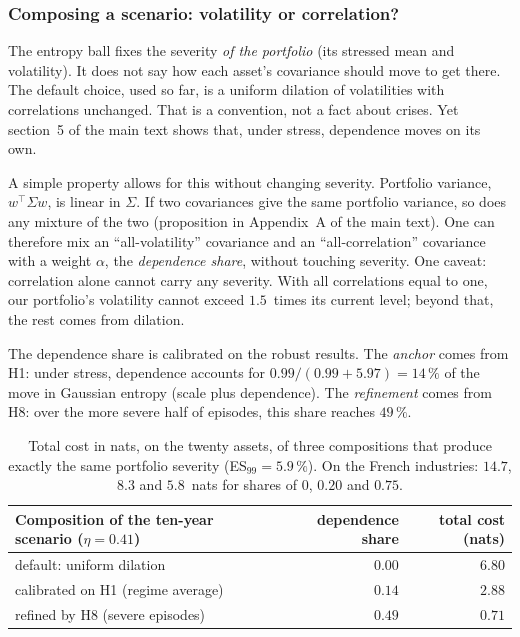 \documentclass[11pt]{article}
\theoremstyle{definition}
\begin{document}
\subsubsection{Composing a scenario: volatility or correlation?}
\label{sec:composition}

The entropy ball fixes the severity \emph{of the portfolio} (its stressed mean
and volatility). It does not say how each asset's covariance should move to
get there. The default choice, used so far, is a uniform dilation of
volatilities with correlations unchanged. That is a convention, not a fact
about crises. Yet section~5 of the main text shows that, under stress,
dependence moves on its own.

A simple property allows for this without changing severity. Portfolio
variance, $w^\top\Sigma w$, is linear in $\Sigma$. If two covariances give the
same portfolio variance, so does any mixture of the two (proposition in
Appendix~A of the main text). One can therefore mix an ``all-volatility''
covariance and an ``all-correlation'' covariance with a weight $\alpha$, the
\emph{dependence share}, without touching severity. One caveat: correlation
alone cannot carry any severity. With all correlations equal to one, our
portfolio's volatility cannot exceed $1.5$~times its current level; beyond
that, the rest comes from dilation.

The dependence share is calibrated on the robust results. The \emph{anchor}
comes from H1: under stress, dependence accounts for $0.99/(0.99+5.97)=14\,\%$
of the move in Gaussian entropy (scale plus dependence). The
\emph{refinement} comes from H8: over the more severe half of episodes, this
share reaches $49\,\%$.

\begin{table}[htbp]
\centering
\small
\begin{tabular}{@{}lrr@{}}
\toprule
Composition of the ten-year scenario ($\eta=0.41$) & dependence share & total cost (nats) \\
\midrule
default: uniform dilation & $0.00$ & $6.80$ \\
calibrated on H1 (regime average) & $0.14$ & $2.88$ \\
refined by H8 (severe episodes) & $0.49$ & $0.71$ \\
\bottomrule
\end{tabular}
\caption{Total cost in nats, on the twenty assets, of three compositions that
produce exactly the same portfolio severity (ES$_{99}=5.9\,\%$). On the French
industries: $14.7$, $8.3$ and $5.8$~nats for shares of $0$, $0.20$ and
$0.75$.}
\label{tab:composition}
\end{table}
\end{document}
